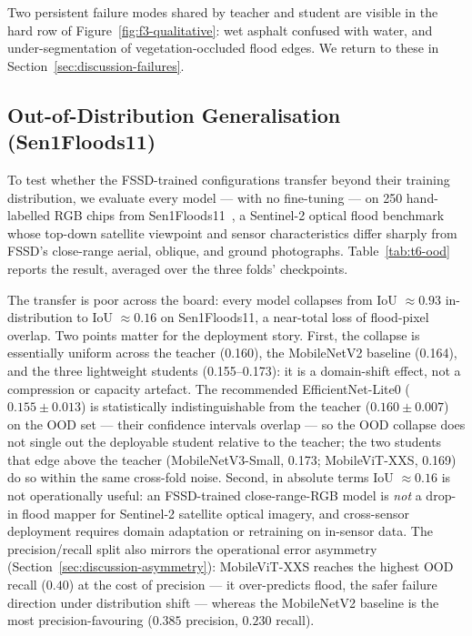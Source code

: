 Two persistent failure modes shared by teacher and student are visible in the hard row of Figure~\ref{fig:f3-qualitative}: wet asphalt confused with water, and under-segmentation of vegetation-occluded flood edges. We return to these in Section~\ref{sec:discussion-failures}.

\subsection{Out-of-Distribution Generalisation (Sen1Floods11)}
\label{sec:results-ood}

To test whether the FSSD-trained configurations transfer beyond their training distribution, we evaluate every model --- with no fine-tuning --- on 250 hand-labelled RGB chips from Sen1Floods11~\cite{bonafilia2020sen1floods11}, a Sentinel-2 optical flood benchmark whose top-down satellite viewpoint and sensor characteristics differ sharply from FSSD's close-range aerial, oblique, and ground photographs. Table~\ref{tab:t6-ood} reports the result, averaged over the three folds' checkpoints.



The transfer is poor across the board: every model collapses from IoU $\approx 0.93$ in-distribution to IoU $\approx 0.16$ on Sen1Floods11, a near-total loss of flood-pixel overlap. Two points matter for the deployment story. First, the collapse is essentially uniform across the teacher (0.160), the MobileNetV2 baseline (0.164), and the three lightweight students (0.155--0.173): it is a domain-shift effect, not a compression or capacity artefact. The recommended EfficientNet-Lite0 ($0.155 \pm 0.013$) is statistically indistinguishable from the teacher ($0.160 \pm 0.007$) on the OOD set --- their confidence intervals overlap --- so the OOD collapse does not single out the deployable student relative to the teacher; the two students that edge above the teacher (MobileNetV3-Small, 0.173; MobileViT-XXS, 0.169) do so within the same cross-fold noise. Second, in absolute terms IoU $\approx 0.16$ is not operationally useful: an FSSD-trained close-range-RGB model is \emph{not} a drop-in flood mapper for Sentinel-2 satellite optical imagery, and cross-sensor deployment requires domain adaptation or retraining on in-sensor data. The precision/recall split also mirrors the operational error asymmetry (Section~\ref{sec:discussion-asymmetry}): MobileViT-XXS reaches the highest OOD recall ($0.40$) at the cost of precision --- it over-predicts flood, the safer failure direction under distribution shift --- whereas the MobileNetV2 baseline is the most precision-favouring ($0.385$ precision, $0.230$ recall).
